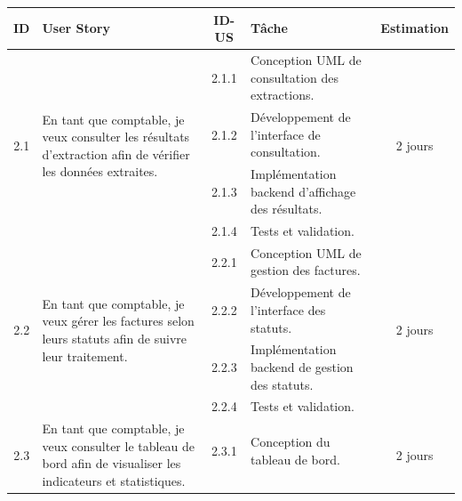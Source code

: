 \begin{table}[H]
	\centering
	\footnotesize
	
	\begin{tabularx}{\textwidth}{|c|p{3.6cm}|c|X|c|}
		\hline
		
		\rowcolor{blue!20}
		\textbf{ID} &
		\textbf{User Story} &
		\textbf{ID-US} &
		\textbf{Tâche} &
		\textbf{Estimation}
		\\ \hline
		
		
		\multirow{4}{*}{2.1}
		& \multirow{4}{3.6cm}{
			En tant que comptable, je veux consulter les résultats d’extraction afin de vérifier les données extraites.
		}
		& 2.1.1 & Conception UML de consultation des extractions. & \multirow{4}{*}{2 jours}
		\\ \cline{3-4}
		
		& & 2.1.2 & Développement de l’interface de consultation.
		& \\ \cline{3-4}
		
		& & 2.1.3 & Implémentation backend d’affichage des résultats.
		& \\ \cline{3-4}
		
		& & 2.1.4 & Tests et validation.
		& \\ \hline
		
		
		\multirow{4}{*}{2.2}
		& \multirow{4}{3.6cm}{
			En tant que comptable, je veux gérer les factures selon leurs statuts afin de suivre leur traitement.
		}
		& 2.2.1 & Conception UML de gestion des factures. & \multirow{4}{*}{2 jours}
		\\ \cline{3-4}
		
		& & 2.2.2 & Développement de l’interface des statuts.
		& \\ \cline{3-4}
		
		& & 2.2.3 & Implémentation backend de gestion des statuts.
		& \\ \cline{3-4}
		
		& & 2.2.4 & Tests et validation.
		& \\ \hline
		
		
		\multirow{4}{*}{2.3}
		& \multirow{4}{3.6cm}{
			En tant que comptable, je veux consulter le tableau de bord afin de visualiser les indicateurs et statistiques.
		}
		& 2.3.1 & Conception du tableau de bord. & \multirow{4}{*}{2 jours}
		\\ \cline{3-4}
		

\end{tabularx}
\end{table}
